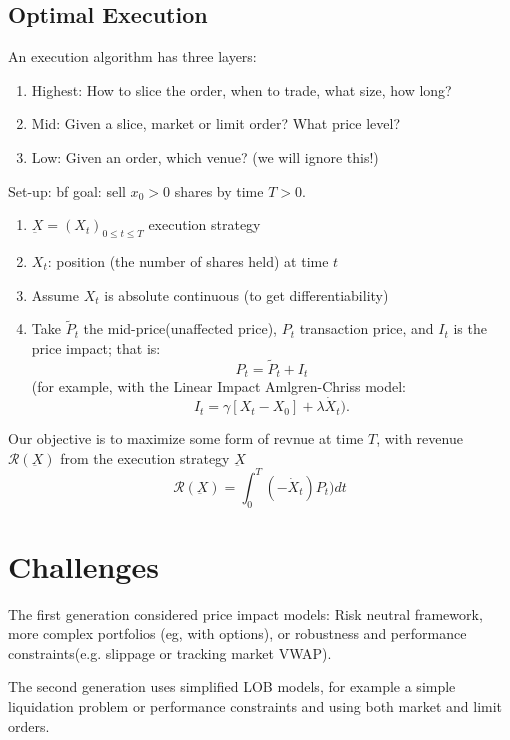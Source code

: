 \subsection{Optimal Execution}
An execution algorithm has three layers:
\begin{enumerate}
	\item Highest: How to slice the order, when to trade, what size, how long?
	\item Mid: Given a slice, market or limit order? What price level?
	\item Low: Given an order, which venue? (we will ignore this!)
\end{enumerate}

Set-up:
{bf goal: } sell $x_0>0$ shares by time $T>0$.
\begin{enumerate}
	\item $\underbar{X} = (X_t)_{0\leq t \leq T}$ execution strategy
	\item $X_t$: position (the number of shares held) at time $t$
	\item Assume $X_t$ is absolute continuous (to get differentiability)
	\item Take $\tilde{P}_t$ the mid-price(unaffected price), $P_t$ transaction price, and $I_t$ is the price impact; that is:
	\begin{equation}
		P_t = \tilde{P}_t + I_t
	\end{equation}
	(for example, with the Linear Impact Amlgren-Chriss model:
	\begin{equation}
		I_t = \gamma [X_t - X_0] + \lambda \dot{X}_t).
	\end{equation}
\end{enumerate}

Our objective is to maximize some form of revnue at time $T$, with revenue $\mathcal{R}(\underbar{X})$ from the execution strategy $\underbar{X}$
\begin{equation}
	\mathcal{R}(\underbar{X}) = \int_0^T (-\dot{X}_t)P_t) dt
\end{equation}


\section{Challenges}
The first generation considered price impact models: Risk neutral framework, more complex portfolios (eg, with options), or robustness and performance constraints(e.g. slippage or tracking market VWAP).

The second generation uses simplified LOB models, for example a simple liquidation problem or performance constraints and using both market and limit orders.

